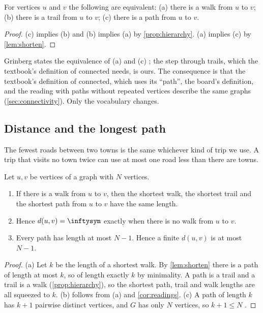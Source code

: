 \begin{corollary}\label{cor:readings}
For vertices $u$ and $v$ the following are equivalent: (a) there is a walk
from $u$ to $v$; (b) there is a trail from $u$ to $v$; (c) there is a path
from $u$ to $v$.
\end{corollary}

\begin{proof}
(c) implies (b) and (b) implies (a) by \cref{prop:hierarchy}. (a) implies (c)
by \cref{lem:shorten}.
\end{proof}

Grinberg states the equivalence of (a) and (c)
\cite[Proposition 2.9.10, p.~42]{grinberg2025introduction}; the step through
trails, which the textbook's definition of connected needs, is ours. The
consequence is that the textbook's definition of connected, which uses its
``path'', the board's definition, and the reading with paths without repeated
vertices describe the same graphs (\cref{sec:connectivity}). Only the
vocabulary changes.

\subsection{Distance and the longest path}

\plain The fewest roads between two towns is the same whichever kind of trip
we use. A trip that visits no town twice can use at most one road less than
there are towns.

\begin{proposition}\label{prop:distance}
Let $u,v$ be vertices of a graph with $N$ vertices.
\begin{enumerate}
\item[(a)] If there is a walk from $u$ to $v$, then the shortest walk, the
  shortest trail and the shortest path from $u$ to $v$ have the same length.
\item[(b)] Hence $d(u,v)=\inftysym$ exactly when there is no walk from $u$ to
  $v$.
\item[(c)] Every path has length at most $N-1$. Hence a finite $d(u,v)$ is at
  most $N-1$.
\end{enumerate}
\end{proposition}

\begin{proof}
(a) Let $k$ be the length of a shortest walk. By \cref{lem:shorten} there is
a path of length at most $k$, so of length exactly $k$ by minimality. A path
is a trail and a trail is a walk (\cref{prop:hierarchy}), so the shortest
path, trail and walk lengths are all squeezed to $k$. (b) follows from (a) and
\cref{cor:readings}. (c) A path of length $k$ has $k+1$ pairwise distinct
vertices, and $G$ has only $N$ vertices, so $k+1\le N$
\cite[Section 2.9.4, p.~40]{grinberg2025introduction}.
\end{proof}

